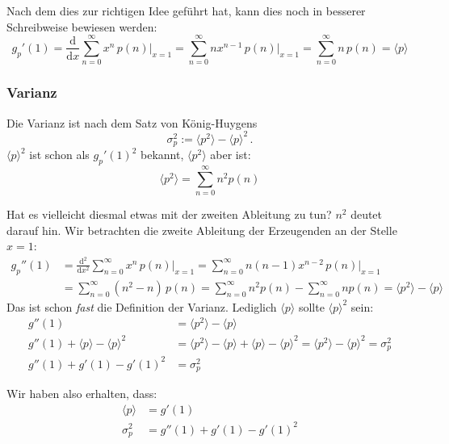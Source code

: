 \documentclass[a4paper]{article}
\newcommand{\dx}{\frac{\mathrm{d}}{\mathrm{d}x}}
\newcommand{\dxx}{\frac{\mathrm{d}^2}{\mathrm{d}x^2}}
\begin{document}
Nach dem dies zur richtigen Idee geführt hat,
kann dies noch in besserer Schreibweise bewiesen werden:
\begin{equation}
    g_p'(1) = \dx \sum_{n=0}^\infty x^n \, p(n) \Big|_{x=1}
            =     \sum_{n=0}^\infty n x^{n-1} \, p(n) \Big|_{x=1}
            =     \sum_{n=0}^\infty n \, p(n)
            = \langle p \rangle
\end{equation}


\subsubsection{Varianz}
Die Varianz ist nach dem Satz von König-Huygens
\begin{equation}
    \sigma_p^2 := \langle p^2 \rangle - \langle p \rangle^2 \,.
\end{equation}
$\langle p \rangle^2$ ist schon als $g_p'(1)^2$ bekannt,
$\langle p^2 \rangle$ aber ist:
\begin{equation}
    \langle p^2 \rangle = \sum_{n=0}^\infty n^2 p(n)
\end{equation}

Hat es vielleicht diesmal etwas mit der zweiten Ableitung zu tun?
$n^2$ deutet darauf hin. Wir betrachten die zweite Ableitung der Erzeugenden
an der Stelle $x=1$:
\begin{align*}
    g_p''(1) &= \dxx \sum_{n=0}^\infty x^n \, p(n) \Big|_{x=1}
             = \sum_{n=0}^\infty n(n-1) x^{n-2} \, p(n) \Big|_{x=1} \\
             &= \sum_{n=0}^\infty (n^2 - n) \, p(n)
             = \sum_{n=0}^\infty n^2 p(n) - \sum_{n=0}^\infty n p(n)
             = \langle p^2 \rangle - \langle p \rangle
\end{align*}
Das ist schon \emph{fast} die Definition der Varianz.
Lediglich $\langle p \rangle$ sollte $\langle p \rangle^2$ sein:
\begin{align*}
    g''(1) &= \langle p^2 \rangle - \langle p \rangle \\
    g''(1) + \langle p \rangle - \langle p \rangle^2  &= \langle p^2 \rangle - \langle p \rangle + \langle p \rangle - \langle p \rangle^2 = \langle p^2 \rangle - \langle p \rangle^2 = \sigma_p^2 \\
    g''(1) + g'(1) - g'(1)^2 &= \sigma_p^2
\end{align*}

Wir haben also erhalten, dass:
{\boldmath
\begin{align}
    \langle p \rangle &= g'(1) \label{eq:erwartungswert} \\
    \sigma_p^2 &= g''(1) + g'(1) - g'(1)^2 \label{eq:varianz}
\end{align}}
\end{document}
